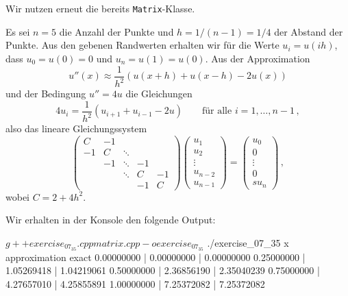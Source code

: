 \section{}

Wir nutzen erneut die bereits \texttt{Matrix}-Klasse.

Es sei $n = 5$ die Anzahl der Punkte und $h = 1/(n-1) = 1/4$ der Abstand der Punkte.
Aus den gebenen Randwerten erhalten wir für die Werte $u_i = u(ih)$, dass $u_0 = u(0) = 0$ und $u_n = u(1) = u(0)$.
Aus der Approximation
\[
          u''(x)
  \approx \frac{1}{h^2}( u(x+h) + u(x-h) - 2u(x))
\]
und der Bedingung $u'' = 4u$ die Gleichungen
\[
    4 u_i
  = \frac{1}{h^2}( u_{i+1} + u_{i-1} - 2u )
  \qquad
  \text{für alle $i = 1, \dotsc, n-1$} \,,
\]
also das lineare Gleichungssystem
\[
  \begin{pmatrix}
     C  & -1  &         &     &     \\
    -1  &  C  & \ddots  &     &     \\
        & -1  & \ddots  & -1  &     \\
        &     & \ddots  &  C  & -1  \\
        &     &         & -1  &  C
  \end{pmatrix}
  \begin{pmatrix}
    u_1     \\
    u_2     \\
    \vdots  \\
    u_{n-2} \\
    u_{n-1}
  \end{pmatrix}
  =
  \begin{pmatrix}
    u_0     \\
    0       \\
    \vdots  \\
    0       \\s
    u_n
  \end{pmatrix} \,,
\]
wobei $C = 2 + 4h^2$.



Wir erhalten in der Konsole den folgende Output:

\begin{consoleoutput}
$ g++ exercise_07_35.cpp matrix.cpp -o exercise_07_35
$ ./exercise_07_35                                  
x                 approximation   exact
0.00000000      | 0.00000000    | 0.00000000
0.25000000      | 1.05269418    | 1.04219061
0.50000000      | 2.36856190    | 2.35040239
0.75000000      | 4.27657010    | 4.25855891
1.00000000      | 7.25372082    | 7.25372082
\end{consoleoutput}


